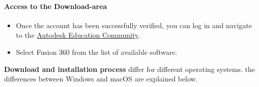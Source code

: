 \paragraph{Access to the Download-area}
\begin{itemize}
	\item Once the account has been successfully verified, you can log in and navigate to the \href{https://www.autodesk.com/education/home}{\underline{Autodesk Education Community}}.
	\item Select Fusion 360 from the list of available software.
\end{itemize}


\textbf{Download and installation process} differ for different operating systems. the differences between Windows and macOS are explained below.
